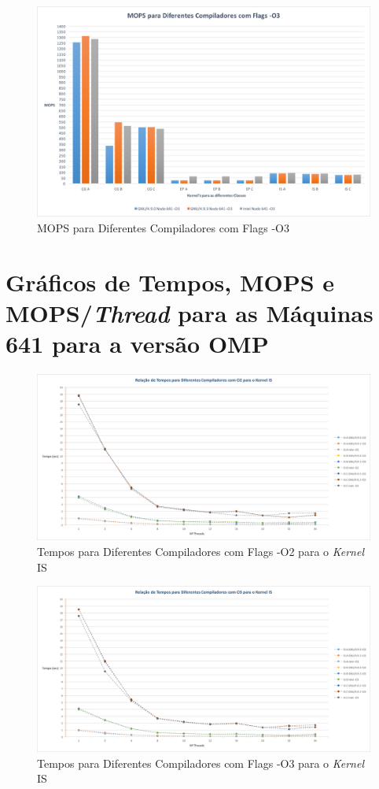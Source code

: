 \documentclass[conference,compsoc]{IEEEtran}
\begin{document}
\begin{figure}[h!]
\centering
\includegraphics[scale=0.325]{SER/mops_dif_comp_O3_nodo_641.png}
\caption{MOPS para Diferentes Compiladores com Flags -O3}
\end{figure}

\section{Gráficos de Tempos, MOPS e MOPS/\textit{Thread} para as Máquinas 641 para a versão OMP}
\label{appendix:641_omp}

\begin{figure}[h!]
\centering
\includegraphics[scale=0.25]{OMP/tempos_dif_comp-O2_IS_nodo-641.png}
\caption{Tempos para Diferentes Compiladores com Flags -O2 para o \textit{Kernel} IS}
\end{figure}

\begin{figure}[h!]
\centering
\includegraphics[scale=0.25]{OMP/tempos_dif_comp-O3_IS_nodo-641.png}
\caption{Tempos para Diferentes Compiladores com Flags -O3 para o \textit{Kernel} IS}
\end{figure}
\end{document}
